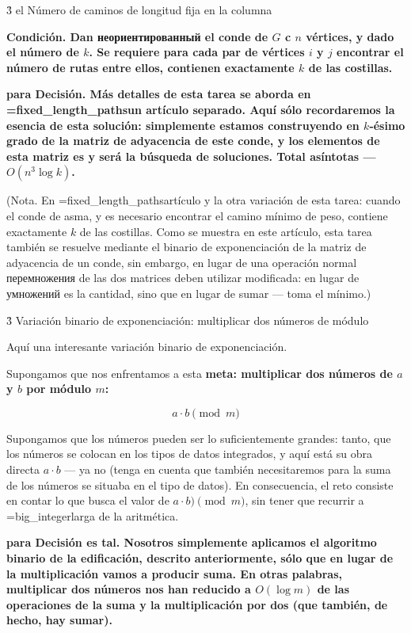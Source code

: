 \h3{ el Número de caminos de longitud fija en la columna }

\bf{Condición}. Dan неориентированный el conde de $G$ c $n$ vértices, y dado el número de $k$. Se requiere para cada par de vértices $i$ y $j$ encontrar el número de rutas entre ellos, contienen exactamente $k$ de las costillas.

\bf{para Decisión}. Más detalles de esta tarea se aborda en \algohref=fixed_length_paths{un artículo separado}. Aquí sólo recordaremos la esencia de esta solución: simplemente estamos construyendo en $k$-ésimo grado de la matriz de adyacencia de este conde, y los elementos de esta matriz es y será la búsqueda de soluciones. Total asíntotas --- $O (n^3 \log k)$.

(Nota. En \algohref=fixed_length_paths{artículo} y la otra variación de esta tarea: cuando el conde de asma, y es necesario encontrar el camino mínimo de peso, contiene exactamente $k$ de las costillas. Como se muestra en este artículo, esta tarea también se resuelve mediante el binario de exponenciación de la matriz de adyacencia de un conde, sin embargo, en lugar de una operación normal перемножения de las dos matrices deben utilizar modificada: en lugar de умножений es la cantidad, sino que en lugar de sumar --- toma el mínimo.)


\h3{ Variación binario de exponenciación: multiplicar dos números de módulo }

Aquí una interesante variación binario de exponenciación.

Supongamos que nos enfrentamos a esta \bf{meta}: multiplicar dos números de $a$ y $b$ por módulo $m$:

$$ a \cdot b \pmod m $$

Supongamos que los números pueden ser lo suficientemente grandes: tanto, que los números se colocan en los tipos de datos integrados, y aquí está su obra directa $a \cdot b$ --- ya no (tenga en cuenta que también necesitaremos para la suma de los números se situaba en el tipo de datos). En consecuencia, el reto consiste en contar lo que busca el valor de $a \cdot b) \pmod m$, sin tener que recurrir a \algohref=big_integer{larga de la aritmética}.

\bf{para Decisión} es tal. Nosotros simplemente aplicamos el algoritmo binario de la edificación, descrito anteriormente, sólo que en lugar de la multiplicación vamos a producir suma. En otras palabras, multiplicar dos números nos han reducido a $O (\log m)$ de las operaciones de la suma y la multiplicación por dos (que también, de hecho, hay sumar).

